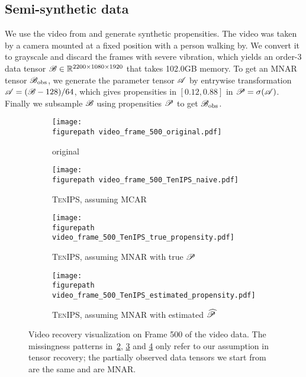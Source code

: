 \documentclass{article}
\newcommand{\T}[2][]{#1\mathscr{\MakeUppercase{#2}}}
\newcommand{\RR}{\mathbb{R}}
\theoremstyle{plain}
\def \figurepath {figures/}
\begin{document}
\subsection{Semi-synthetic data}
\label{sec:experiments-semi-synthetic}
We use the video from \cite{malik2018low} and generate synthetic propensities. 
The video was taken by a camera mounted at a fixed position with a person walking by. 
We convert it to grayscale and discard the frames with severe vibration, which yields an order-3 data tensor $\T{B} \in \RR^{2200 \times 1080 \times 1920}$ that takes 102.0GB memory.
To get an MNAR tensor $\T{B}_\mathrm{obs}$, we generate the parameter tensor $\T{A}$ by entrywise transformation $\T{A} = (\T{B} - 128)/64$, which gives propensities in $[0.12, 0.88]$ in $\T{P} = \sigma (\T{A})$.
Finally we subsample $\T{B}$ using propensities $\T{P}$ to get $\T{B}_\mathrm{obs}$.
\begin{figure}[t]
\centering
	\begin{subfigure}[t]{.22\linewidth}
	\texttt{[image: \\figurepath video\_frame\_500\_original.pdf]}
	\caption{original}
	\label{fig:frame_original}
\end{subfigure}
\hspace{.01\linewidth}
	\begin{subfigure}[t]{.22\linewidth}
	\texttt{[image: \\figurepath video\_frame\_500\_TenIPS\_naive.pdf]}
	\caption{\textsc{TenIPS}, assuming MCAR}
	\label{fig:frame_from_MCAR}
\end{subfigure}
\hspace{.01\linewidth}
	\begin{subfigure}[t]{.22\linewidth}
	\texttt{[image: \\figurepath video\_frame\_500\_TenIPS\_true\_propensity.pdf]}
	\caption{\textsc{TenIPS}, assuming MNAR with true $\T{P}$}
	\label{fig:frame_from_MNAR_true_prop}
\end{subfigure}
\hspace{.01\linewidth}
	\begin{subfigure}[t]{.22\linewidth}
	\texttt{[image: \\figurepath video\_frame\_500\_TenIPS\_estimated\_propensity.pdf]}
	\caption{\textsc{TenIPS}, assuming MNAR with estimated $\widehat{\T{P}}$}
	\label{fig:frame_from_MNAR_estimated_prop}
	\end{subfigure}	
	
	\caption{Video recovery visualization on Frame 500 of the \cite{malik2018low} video data.
		The missingness patterns in~\ref{fig:frame_from_MCAR}, \ref{fig:frame_from_MNAR_true_prop} and \ref{fig:frame_from_MNAR_estimated_prop} only refer to our assumption in tensor recovery; the partially observed data tensors we start from are the same and are MNAR.}
	\label{fig:frame}
\end{figure}
\end{document}
